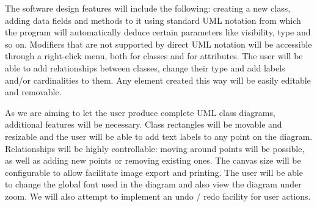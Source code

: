 
The software design features will include the following: creating a new class, adding data fields and methods to it using standard UML notation from which the program will automatically deduce certain parameters like visibility, type and so on. Modifiers that are not supported by direct UML notation will be accessible through a right-click menu, both for classes and for attributes. The user will be able to add relationships between classes, change their type and add labels and/or cardinalities to them. Any element created this way will be easily editable and removable.


As we are aiming to let the user produce complete UML class diagrams, additional features will be necessary. Class rectangles will be movable and resizable and the user will be able to add text labels to any point on the diagram. Relationships will be highly controllable: moving around points will be possible, as well as adding new points or removing existing ones. The canvas size will be configurable to allow facilitate image export and printing. The user will be able to change the global font used in the diagram and also view the diagram under zoom. We will also attempt to implement an undo / redo facility for user actions.
